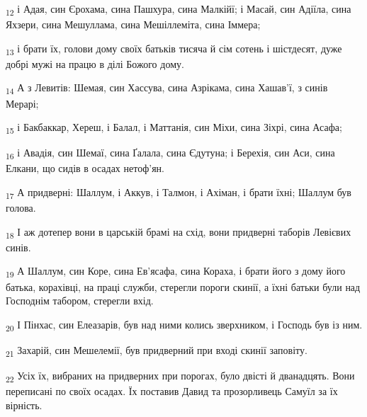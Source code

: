 \begin{tcolorbox}
\textsubscript{12} і Адая, син Єрохама, сина Пашхура, сина Малкійї; і Масай, син Адіїла, сина Яхзери, сина Мешуллама, сина Мешіллеміта, сина Іммера;
\end{tcolorbox}
\begin{tcolorbox}
\textsubscript{13} і брати їх, голови дому своїх батьків тисяча й сім сотень і шістдесят, дуже добрі мужі на працю в ділі Божого дому.
\end{tcolorbox}
\begin{tcolorbox}
\textsubscript{14} А з Левитів: Шемая, син Хассува, сина Азрікама, сина Хашав'ї, з синів Мерарі;
\end{tcolorbox}
\begin{tcolorbox}
\textsubscript{15} і Бакбаккар, Хереш, і Балал, і Маттанія, син Міхи, сина Зіхрі, сина Асафа;
\end{tcolorbox}
\begin{tcolorbox}
\textsubscript{16} і Авадія, син Шемаї, сина Ґалала, сина Єдутуна; і Берехія, син Аси, сина Елкани, що сидів в осадах нетоф'ян.
\end{tcolorbox}
\begin{tcolorbox}
\textsubscript{17} А придверні: Шаллум, і Аккув, і Талмон, і Ахіман, і брати їхні; Шаллум був голова.
\end{tcolorbox}
\begin{tcolorbox}
\textsubscript{18} І аж дотепер вони в царській брамі на схід, вони придверні таборів Левієвих синів.
\end{tcolorbox}
\begin{tcolorbox}
\textsubscript{19} А Шаллум, син Коре, сина Ев'ясафа, сина Кораха, і брати його з дому його батька, корахівці, на праці служби, стерегли пороги скинії, а їхні батьки були над Господнім табором, стерегли вхід.
\end{tcolorbox}
\begin{tcolorbox}
\textsubscript{20} І Пінхас, син Елеазарів, був над ними колись зверхником, і Господь був із ним.
\end{tcolorbox}
\begin{tcolorbox}
\textsubscript{21} Захарій, син Мешелемії, був придверний при вході скинії заповіту.
\end{tcolorbox}
\begin{tcolorbox}
\textsubscript{22} Усіх їх, вибраних на придверних при порогах, було двісті й дванадцять. Вони переписані по своїх осадах. Їх поставив Давид та прозорливець Самуїл за їх вірність.
\end{tcolorbox}
